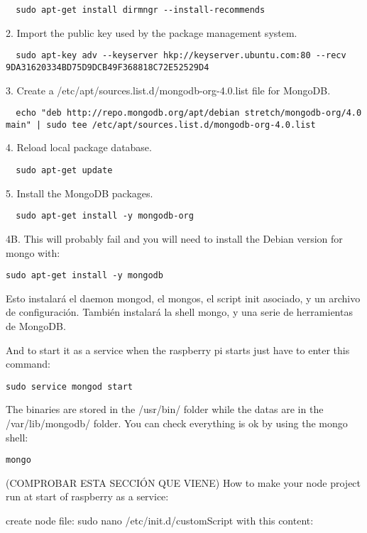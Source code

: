 \begin{verbatim}
  sudo apt-get install dirmngr --install-recommends
\end{verbatim}

2. Import the public key used by the package management system.
\begin{verbatim}
  sudo apt-key adv --keyserver hkp://keyserver.ubuntu.com:80 --recv 9DA31620334BD75D9DCB49F368818C72E52529D4
\end{verbatim}

3. Create a /etc/apt/sources.list.d/mongodb-org-4.0.list file for MongoDB.
\begin{verbatim}
  echo "deb http://repo.mongodb.org/apt/debian stretch/mongodb-org/4.0 main" | sudo tee /etc/apt/sources.list.d/mongodb-org-4.0.list
\end{verbatim}

4. Reload local package database.
\begin{verbatim}
  sudo apt-get update
\end{verbatim}

5. Install the MongoDB packages.
\begin{verbatim}
  sudo apt-get install -y mongodb-org
\end{verbatim}

4B. This will probably fail and you will need to install the Debian version for mongo with:
\begin{verbatim}
sudo apt-get install -y mongodb
\end{verbatim}

Esto instalará el daemon mongod, el mongos, el script init asociado, y un archivo de configuración.
También instalará la shell mongo, y una serie de herramientas de MongoDB.

And to start it as a service when the raspberry pi starts just have to enter this command:
\begin{verbatim}
sudo service mongod start
\end{verbatim}

The binaries are stored in the /usr/bin/ folder while the datas are in the /var/lib/mongodb/ folder. You can check everything is ok by using the mongo shell:
\begin{verbatim}
mongo
\end{verbatim}




(COMPROBAR ESTA SECCIÓN QUE VIENE)
How to make your node project run at start of raspberry as a service:

create node file:
sudo nano /etc/init.d/customScript
with this content:

